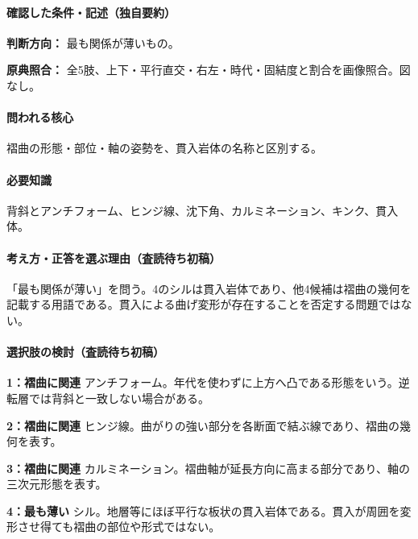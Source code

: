 \paragraph{確認した条件・記述（独自要約）}\mbox{}\par

\noindent\textbf{判断方向：} 最も関係が薄いもの。\par

\noindent\textbf{原典照合：} 全5肢、上下・平行直交・右左・時代・固結度と割合を画像照合。図なし。\par

\paragraph{問われる核心} 褶曲の形態・部位・軸の姿勢を、貫入岩体の名称と区別する。

\paragraph{必要知識} 背斜とアンチフォーム、ヒンジ線、沈下角、カルミネーション、キンク、貫入体。

\paragraph{考え方・正答を選ぶ理由（査読待ち初稿）} 「最も関係が薄い」を問う。4のシルは貫入岩体であり、他4候補は褶曲の幾何を記載する用語である。貫入による曲げ変形が存在することを否定する問題ではない。

\paragraph{選択肢の検討（査読待ち初稿）}\mbox{}\par

\noindent\textbf{1：褶曲に関連} アンチフォーム。年代を使わずに上方へ凸である形態をいう。逆転層では背斜と一致しない場合がある。\par

\noindent\textbf{2：褶曲に関連} ヒンジ線。曲がりの強い部分を各断面で結ぶ線であり、褶曲の幾何を表す。\par

\noindent\textbf{3：褶曲に関連} カルミネーション。褶曲軸が延長方向に高まる部分であり、軸の三次元形態を表す。\par

\noindent\textbf{4：最も薄い} シル。地層等にほぼ平行な板状の貫入岩体である。貫入が周囲を変形させ得ても褶曲の部位や形式ではない。\par

